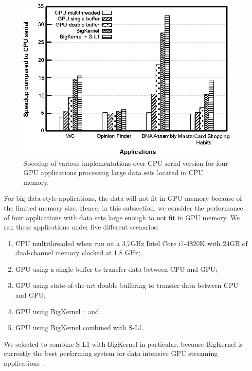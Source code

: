 \begin{figure}[t]
\center
\includegraphics[scale=0.80]{11bigkernelAndSl1.eps}
\vspace{-0.0cm}
\caption{\footnotesize\textnormal{Speedup of various implementations over CPU serial version for four GPU applications processing large data sets located in CPU memory.}}
\label{fig:bigkernelandsl1}
\end{figure}


For big data-style applications, the data will not fit in GPU memory because of the limited memory size. 
Hence, in this subsection, we consider the performance of four applications with data sets large enough to not fit in GPU memory.
We ran these applications under five different scenarios: 
\begin{enumerate}
\item CPU multithreaded when run on a 3.7GHz Intel Core i7-4820K with 24GB of dual-channel memory clocked at 1.8 GHz;
\item GPU using a single buffer to transfer data between CPU and GPU;
\item GPU using state-of-the-art double buffering to transfer data between CPU and GPU;
\item GPU using BigKernel~\cite{mokhtari2014bigkernel}; and
\item GPU using BigKernel combined with S-L1.
\end{enumerate} 
We selected to combine S-L1 with BigKernel in particular, because BigKernel is
currently the best performing system for data intensive GPU streaming
applications~\cite{mokhtari2014bigkernel}.

